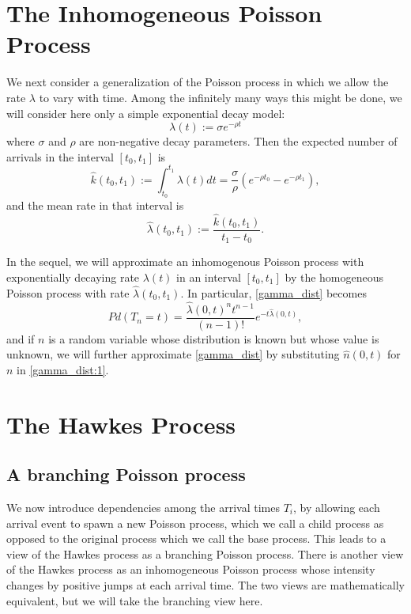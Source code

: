 \documentclass[12pt,leqno]{article}
\begin{document}
\section{The Inhomogeneous Poisson Process}
We next consider a generalization of the Poisson process in which we allow the rate $\lambda$ to vary with time.
Among the infinitely many ways this might be done, we will consider here only a simple exponential decay model:
\begin{equation}\label{exp_rate}
  \lambda(t) := {\sigma}e^{-\rho{t}}
\end{equation}
where $\sigma$ and $\rho$ are non-negative decay parameters.
Then the expected number of arrivals in the interval $[t_0,t_1]$ is
\begin{equation}\label{k_hat}
  \hat{k}(t_0,t_1) := \int_{t_0}^{t_1}\lambda(t)dt = \frac{\sigma}{\rho}(e^{-\rho{t_0}}- e^{-\rho{t_1}}),
\end{equation}
and the mean rate in that interval is
\begin{equation}\label{lambda_hat}
  \hat{\lambda}(t_0,t_1) := \frac{\hat{k}(t_0,t_1)}{t_1 - t_0}.
\end{equation}

In the sequel, we will approximate an inhomogenous Poisson process with exponentially decaying rate $\lambda(t)$
in an interval $[t_0,t_1]$ by the homogeneous Poisson process with rate $\hat{\lambda}(t_0,t_1)$.  In particular,
\eqref{gamma_dist} becomes
\begin{equation}\label{gamma_dist:1}
  Pd(T_n = t) = \frac{\hat{\lambda}(0,t)^nt^{n-1}}{(n-1)!}e^{-t\hat{\lambda}(0,t)},
\end{equation}
and if $n$ is a random variable whose distribution is known but whose value is unknown, we will further approximate
\eqref{gamma_dist} by substituting $\hat{n}(0,t)$ for $n$ in \eqref{gamma_dist:1}.


\section{The Hawkes Process}
\subsection{A branching Poisson process}
We now introduce dependencies among the arrival times $T_i$, by allowing each arrival event 
to spawn a new Poisson process, which we call a child process as opposed to the original process which we
call the base process.  This leads to a view of the Hawkes process as a branching Poisson process. There
is another view of the Hawkes process as an inhomogeneous Poisson process whose intensity changes by positive
jumps at each arrival time.  The two views are mathematically equivalent, but we will take the branching view here.
\end{document}
